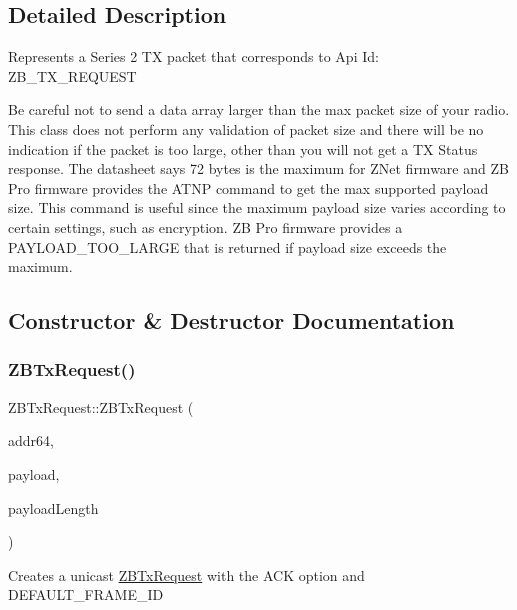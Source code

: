 \subsection{Detailed Description}
Represents a Series 2 TX packet that corresponds to Api Id\+: Z\+B\+\_\+\+T\+X\+\_\+\+R\+E\+Q\+U\+E\+ST

Be careful not to send a data array larger than the max packet size of your radio. This class does not perform any validation of packet size and there will be no indication if the packet is too large, other than you will not get a TX Status response. The datasheet says 72 bytes is the maximum for Z\+Net firmware and ZB Pro firmware provides the A\+T\+NP command to get the max supported payload size. This command is useful since the maximum payload size varies according to certain settings, such as encryption. ZB Pro firmware provides a P\+A\+Y\+L\+O\+A\+D\+\_\+\+T\+O\+O\+\_\+\+L\+A\+R\+GE that is returned if payload size exceeds the maximum. 

\subsection{Constructor \& Destructor Documentation}
\hypertarget{class_z_b_tx_request_a2e4839bb04fb5e978ae02474bcc695d6}{}\label{class_z_b_tx_request_a2e4839bb04fb5e978ae02474bcc695d6} 
\subsubsection{\texorpdfstring{Z\+B\+Tx\+Request()}{ZBTxRequest()}\hspace{0.1cm}{\footnotesize\ttfamily [1/2]}}
{\footnotesize\ttfamily Z\+B\+Tx\+Request\+::\+Z\+B\+Tx\+Request (\begin{DoxyParamCaption}\item[{const \hyperlink{class_x_bee_address64}{X\+Bee\+Address64} \&}]{addr64,  }\item[{uint8\+\_\+t $\ast$}]{payload,  }\item[{uint8\+\_\+t}]{payload\+Length }\end{DoxyParamCaption})}

Creates a unicast \hyperlink{class_z_b_tx_request}{Z\+B\+Tx\+Request} with the A\+CK option and D\+E\+F\+A\+U\+L\+T\+\_\+\+F\+R\+A\+M\+E\+\_\+\+ID \hypertarget{class_z_b_tx_request_a410499f31a049f0bd4bbc8299ec74e24}{}\label{class_z_b_tx_request_a410499f31a049f0bd4bbc8299ec74e24} 
